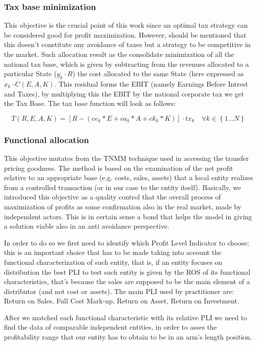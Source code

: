 \documentclass{article}
\begin{document}
\subsubsection{Tax base minimization}
This objective is the crucial point of this work since an optimal tax strategy can be considered good for profit maximization. However, should be mentioned that this doesn't constitute any avoidance of taxes but a strategy to be competitive in the market. Such allocation result as the consolidate minimization of all the national tax base, which is given by subtracting from the revenues allocated to a particular State ($y_k \cdot R$) the cost allocated to the same State (here expressed as $x_k \cdot C(E, A,K)$. This residual forms the EBIT (namely Earnings Before Intrest and Taxes), by multiplying this the EBIT by the national corporate tax we get the Tax Base. The tax base function will look as follows:

\[
T(R,E,A,K)= [R-(ce_k*E+ca_k*A+ck_k*K)]\cdot tx_k \quad \forall k \in \left\{1...N\right\}
\]

\subsubsection{Functional allocation}
This objective mutates from the TNMM technique used in accessing the transfer pricing goodness. The method is based on the examination of the net profit relative to an appropriate base (e.g. costs, sales, assets) that a local entity realizes from a controlled transaction (or in our case to the entity itself). Basically, we introduced this objective as a quality control that the overall process of maximization of profits as some confirmation also in the real market, made by independent actors. This is in certain sense a bond that helps the model in giving a solution viable also in an anti avoidance perspective.

In order to do so we first need to identify which Profit Level Indicator to choose; this is an important choice that has to be made taking into account the functional characterization of such entity, that is, if an entity focuses on distribution the best PLI to test such entity is given by the ROS of its functional characteristics, that's because the sales are supposed to be the main element of a distributor (and not cost or assets). The main PLI used by practitioner are: Return on Sales, Full Cost Mark-up, Return on Asset, Return on Investment.

After we matched each functional characteristic with its relative PLI we need to find the data of comparable independent entities, in order to asses the profitability range that our entity has to obtain to be in an arm's length position.
\end{document}
